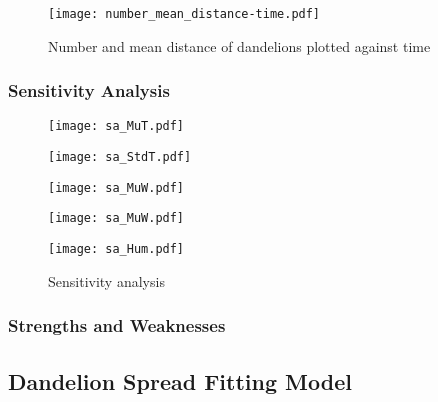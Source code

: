 \documentclass[12pt]{article}
\begin{document}
			\begin{figure}
				\centering
				\texttt{[image: number\_mean\_distance-time.pdf]}
				\caption{Number and mean distance of dandelions plotted against time}
				\label{fig:time}
			\end{figure}
		
		\subsubsection{Sensitivity Analysis}
		
			\begin{figure}
				\centering
				\begin{minipage}{0.04\textwidth}\end{minipage}
				\begin{minipage}{0.46\textwidth}
					\texttt{[image: sa\_MuT.pdf]}
				\end{minipage}
				\begin{minipage}{0.46\textwidth}
					\texttt{[image: sa\_StdT.pdf]}
				\end{minipage}
				\begin{minipage}{0.04\textwidth}\end{minipage}
				
				\begin{minipage}{0.04\textwidth}\end{minipage}
				\begin{minipage}{0.46\textwidth}
					\texttt{[image: sa\_MuW.pdf]}
				\end{minipage}
				\begin{minipage}{0.46\textwidth}
					\texttt{[image: sa\_MuW.pdf]}
				\end{minipage}
				\begin{minipage}{0.04\textwidth}\end{minipage}
				
				\texttt{[image: sa\_Hum.pdf]}
				\caption{Sensitivity analysis}
				\label{fig:sa}
			\end{figure}
			
		\subsubsection{Strengths and Weaknesses}
		
	\subsection{Dandelion Spread Fitting Model}
		
\end{document}

